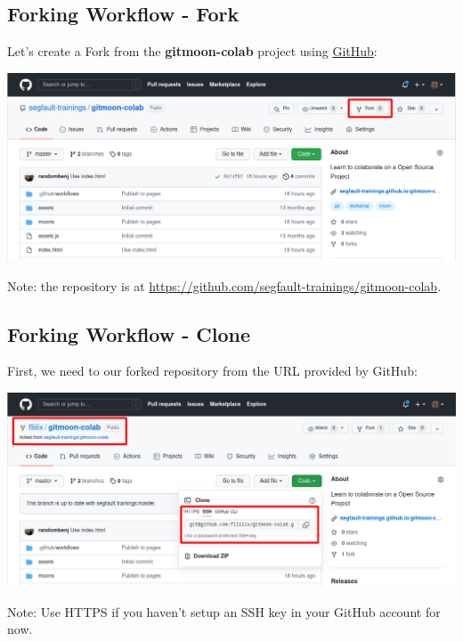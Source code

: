\subsection{Forking Workflow - Fork}
\begin{frame}[fragile]
  \subslidetitle

  Let's create a Fork from the \textbf{gitmoon-colab} project using \href{https://github.com}{GitHub}:

    \vspace{2em}
    \centerline{\includegraphics[width=\textwidth]{../assets/images/github-forking.png}}

    \vspace{1em}
  Note: the repository is at \url{https://github.com/segfault-trainings/gitmoon-colab}.

\end{frame}

\subsection{Forking Workflow - Clone}
\begin{frame}[fragile]
  \subslidetitle

    First, we need to  our forked repository from the URL provided by GitHub:

    \vspace{1em}
    \centerline{\includegraphics[width=\textwidth]{../assets/images/github-clone.png}}

    \vspace{1em}
    Note: Use HTTPS if you haven't setup an SSH key in your GitHub account for now.
\end{frame}

